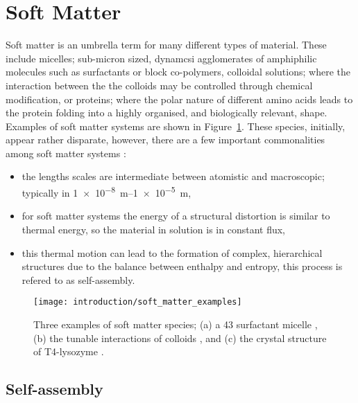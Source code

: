 \section{Soft Matter}

Soft matter is an umbrella term for many different types of material.
These include micelles; sub-micron sized, dynamcsi agglomerates of amphiphilic molecules such as surfactants or block co-polymers, colloidal solutions; where the interaction between the the colloids may be controlled through chemical modification, or proteins; where the polar nature of different amino acids leads to the protein folding into a highly organised, and biologically relevant, shape.
Examples of soft matter systems are shown in Figure~\ref{fig:soft}.
These species, initially, appear rather disparate, however, there are a few important commonalities among soft matter systems \cite{jones_soft_2002}:
\begin{itemize}
\item the lengths scales are intermediate between atomistic and macroscopic; typically in \SIrange{1e-8}{1e-5}{\meter},
\item for soft matter systems the energy of a structural distortion is similar to thermal energy, so the material in solution is in constant flux,
\item this thermal motion can lead to the formation of complex, hierarchical structures due to the balance between enthalpy and entropy, this process is refered to as self-assembly.
\end{itemize}
%
\begin{figure}
    \centering
    \texttt{[image: introduction/soft\_matter\_examples]}
    \caption{Three examples of soft matter species; (a) a 43  surfactant micelle \cite{hargreaves_atomistic_2011}, (b) the tunable interactions of colloids \cite{kraft_patchy_2011}, and (c) the crystal structure of T4-lysozyme \cite{rose_crystal_1988}.}
    \label{fig:soft}
\end{figure}
%

\subsection{Self-assembly}

